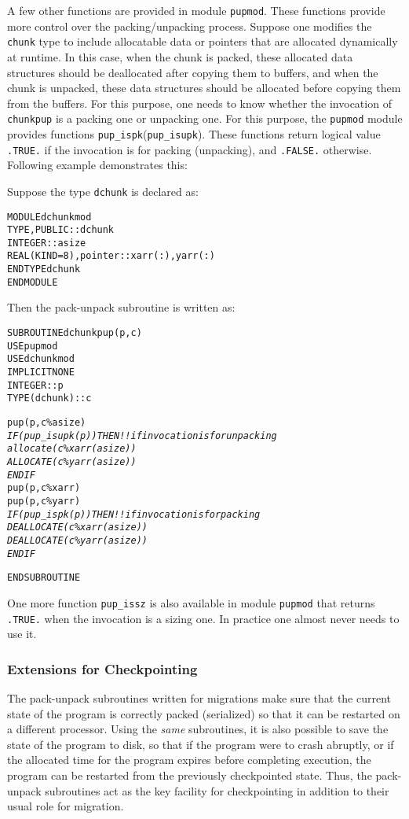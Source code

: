 \documentclass[10pt]{article}
\begin{document}
A few other functions are provided in module \texttt{pupmod}. These functions
provide more control over the packing/unpacking process. Suppose one modifies
the \texttt{chunk} type to include allocatable data or pointers that are
allocated dynamically at runtime. In this case, when the chunk is packed, these
allocated data structures should be deallocated after copying them to buffers,
and when the chunk is unpacked, these data structures should be allocated
before copying them from the buffers.  For this purpose, one needs to know
whether the invocation of \texttt{chunkpup} is a packing one or unpacking one.
For this purpose, the \texttt{pupmod} module provides functions
\verb+pup_ispk+(\verb+pup_isupk+). These functions return logical value
\verb+.TRUE.+ if the invocation is for packing (unpacking), and \verb+.FALSE.+
otherwise. Following example demonstrates this:

Suppose the type \texttt{dchunk} is declared as:

\begin{alltt}
MODULE dchunkmod
  TYPE, PUBLIC :: dchunk
      INTEGER :: asize
      REAL(KIND=8), pointer :: xarr(:), yarr(:)
  END TYPE dchunk
END MODULE
\end{alltt}

Then the pack-unpack subroutine is written as:

\begin{alltt}
SUBROUTINE dchunkpup(p, c)
  USE pupmod
  USE dchunkmod
  IMPLICIT NONE
  INTEGER :: p
  TYPE(dchunk) :: c

  pup(p, c\%asize)
  \emph{
  IF (pup_isupk(p)) THEN       !! if invocation is for unpacking
    allocate(c\%xarr(asize))
    ALLOCATE(c\%yarr(asize))
  ENDIF
  }
  pup(p, c\%xarr)
  pup(p, c\%yarr)
  \emph{
  IF (pup_ispk(p)) THEN        !! if invocation is for packing
    DEALLOCATE(c\%xarr(asize))
    DEALLOCATE(c\%yarr(asize))
  ENDIF
  }

END SUBROUTINE
\end{alltt}

One more function \verb+pup_issz+ is also available in module \texttt{pupmod}
that returns \verb+.TRUE.+ when the invocation is a sizing one. In practice one
almost never needs to use it.

\subsubsection{Extensions for Checkpointing}

The pack-unpack subroutines written for migrations make sure that the current
state of the program is correctly packed (serialized) so that it can be
restarted on a different processor. Using the \emph{same} subroutines, it
is also possible to save the state of the program to disk, so that if the 
program were to crash abruptly, or if the allocated time for the program
expires before completing execution, the program can be restarted from the
previously checkpointed state. Thus, the pack-unpack subroutines act as the key facility for checkpointing in addition to their usual role for migration.
\end{document}
